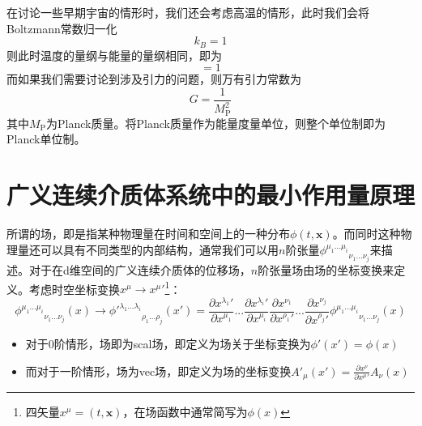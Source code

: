 在讨论一些早期宇宙的情形时，我们还会考虑高温的情形，此时我们会将Boltzmann常数归一化
\begin{equation}
    k_B = 1
\end{equation}
则此时温度的量纲与能量的量纲相同，即为
\begin{equation}
    [T]=1
\end{equation}
而如果我们需要讨论到涉及引力的问题，则万有引力常数为
\begin{equation}
    G = \frac{1}{M_\text{P}^2}
\end{equation}
其中$M_\text{P}$为Planck质量。将Planck质量作为能量度量单位，则整个单位制即为Planck单位制。
\section{广义连续介质体系统中的最小作用量原理}
所谓的场，即是指某种物理量在时间和空间上的一种分布$\phi(t,\boldsymbol{x})$。而同时这种物理量还可以具有不同类型的内部结构，通常我们可以用$n$阶张量${\phi^{\mu_1 ...\mu_i}}_{\nu_1...\nu_j}$来描述。对于在d维空间的广义连续介质体的位移场，$n$阶张量场由场的坐标变换来定义。考虑时空坐标变换$x^{\mu}\rightarrow{x^{\mu}}'$\footnote{四矢量$x^\mu=(t,\boldsymbol{x})$，在场函数中通常简写为$\phi(x)$}：
	\begin{equation}
	{\phi^{\mu_1 ...\mu_i}}_{\nu_1...\nu_j}(x)\rightarrow{\phi'^{\lambda_1 ...\lambda_i}}_{\rho_1...\rho_j}(x')=\frac{\partial {x^{\lambda_1}}'}{\partial x^{\mu_1}}...\frac{\partial {x^{\lambda_i}}'}{\partial x^{\mu_i}}\frac{\partial x^{\nu_1}}{\partial {x^{\rho_1}}'}...\frac{\partial x^{\nu_j}}{\partial {x^{\rho_j}}'}{\phi^{\mu_1 ...\mu_i}}_{\nu_1...\nu_j}(x)
	\end{equation}
\begin{itemize}
\item 对于0阶情形，场即为\gls{scal}场，即定义为场关于坐标变换为$\phi'(x')=\phi(x)$
\item 而对于一阶情形，场为\gls{vec}场，即定义为场的坐标变换$A'_\mu(x')=\frac{\partial x^\nu}{\partial {x^\mu}'}A_\nu(x)$
\end{itemize}

